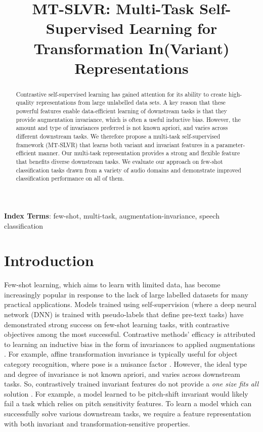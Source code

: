\documentclass{INTERSPEECH2023}
\title{MT-SLVR: Multi-Task Self-Supervised Learning for Transformation In(Variant) Representations}
\begin{document}
\maketitle
\begin{abstract}
Contrastive self-supervised learning has gained attention for its ability to create high-quality representations from large unlabelled data sets. A key reason that these powerful features enable data-efficient learning of downstream tasks is that they provide  augmentation invariance,  which is often a useful inductive bias. However, the amount and type of invariances preferred is not known apriori, and varies across different downstream tasks. We therefore propose a multi-task self-supervised framework (MT-SLVR) that learns both variant and invariant features in a parameter-efficient manner. Our multi-task representation provides a strong and flexible feature that benefits diverse downstream tasks. We evaluate our approach on few-shot classification tasks drawn from a variety of audio domains and demonstrate improved classification performance on all of them.
\end{abstract}

\noindent\textbf{Index Terms}: few-shot, multi-task, augmentation-invariance, speech classification

\section{Introduction}
Few-shot learning, which aims to learn with limited data, has become increasingly popular in response to the lack of large labelled datasets for many practical applications. Models trained using self-supervision (where a deep neural network (DNN) is trained with pseudo-labels that define pre-text tasks) have demonstrated strong success on few-shot learning tasks, with contrastive objectives among the most successful. Contrastive methods' efficacy is attributed to learning an inductive bias in the form of invariances to applied augmentations \cite{simclr,linus_invariance}. For example, affine transformation invariance is typically useful for object category recognition, where pose is a nuisance factor \cite{simclr}. However, the ideal type and degree of invariance is not known apriori, and varies across downstream tasks. So, contrastively trained invariant features do not provide a \emph{one size fits all} solution \cite{linus_invariance,aug_self,hyper_simclr}. For example, a model learned to be pitch-shift invariant \cite{clar} would likely fail a task which relies on pitch sensitivity features. To learn a model which can successfully solve various downstream tasks, we require a feature representation with both invariant and transformation-sensitive properties.
\end{document}
